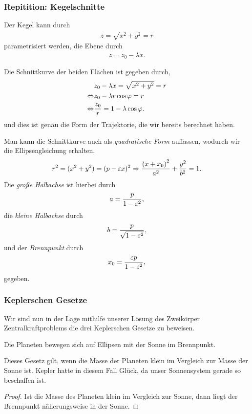 \subsubsection{Repitition: Kegelschnitte}
Der Kegel kann durch
\begin{align*}
z = \sqrt{x^2+y^2} = r
\end{align*}
parametrisiert werden, die Ebene durch
\begin{align*}
z = z_0 - \lambda x.
\end{align*}

Die Schnittkurve der beiden Flächen ist gegeben durch,
\begin{align*}
&z_0-\lambda x = \sqrt{x^2+y^2}=r\\ 
\Leftrightarrow &z_0 -\lambda r\cos\varphi = r\\
\Leftrightarrow &\frac{z_0}{r}  = 1-\lambda\cos\varphi.
\end{align*}
und dies ist genau die Form der Trajektorie, die wir bereits berechnet haben.

Man kann die Schnittkurve auch als \emph{quadratische Form} auffassen, wodurch
wir die Ellipsengleichung erhalten,
\begin{align*}
r^2 = (x^2+y^2) = (p-\varepsilon x)^2 \Rightarrow \frac{\left(x+x_0\right)^2}{a^2} +
\frac{y^2}{b^2} = 1.
\end{align*}
Die \emph{große Halbachse} ist hierbei durch
\begin{align*}
a = \frac{p}{1-\varepsilon^2},
\end{align*}
die \emph{kleine Halbachse} durch
\begin{align*}
b = \frac{p}{\sqrt{1-\varepsilon^2}},
\end{align*}
und der \emph{Brennpunkt} durch
\begin{align*}
x_0 = \frac{\varepsilon p}{1-\varepsilon^2},
\end{align*}
gegeben.

\subsubsection{Keplerschen Gesetze}

Wir sind nun in der Lage mithilfe unserer Lösung des Zweikörper
Zentralkraftproblems die drei Keplerschen Gesetze zu beweisen.
\begin{propn}
Die Planeten bewegen sich auf Ellipsen mit der Sonne im Brennpunkt.\fishhere
\end{propn}
Dieses Gesetz gilt, wenn die Masse der Planeten klein im Vergleich zur Masse
der Sonne ist. Kepler hatte in diesem Fall Glück, da unser Sonnensystem gerade
so beschaffen ist.
\begin{proof}
Ist die Masse des Planeten klein im Vergleich zur Sonne, dann liegt der
Brennpunkt näherungsweise in der Sonne.\qedhere
\end{proof}

